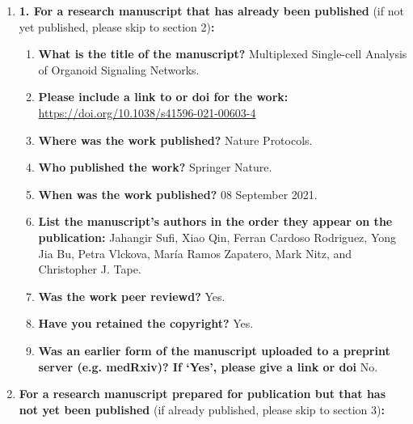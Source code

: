     \begin{enumerate}\itemsep0em
    
        \item \textbf{1.	For a research manuscript that has already been published} (if not yet published, please skip to section 2)\textbf{:}
        \begin{enumerate}\itemsep0em
            \item \textbf{What is the title of the manuscript?}
            Multiplexed Single-cell Analysis of Organoid Signaling Networks.
            \item \textbf{Please include a link to or doi for the work:}
            \url{https://doi.org/10.1038/s41596-021-00603-4}
            \item \textbf{Where was the work published?}
            Nature Protocols.
            \item \textbf{Who published the work?}
            Springer Nature.
            \item \textbf{When was the work published?}
            08 September 2021.
            \item \textbf{List the manuscript's authors in the order they appear on the publication:}
            Jahangir Sufi, Xiao Qin, Ferran Cardoso Rodriguez, Yong Jia Bu, Petra Vlckova, María Ramos Zapatero, Mark Nitz, and Christopher J. Tape.   
            \item \textbf{Was the work peer reviewd?}
            Yes.
            \item \textbf{Have you retained the copyright?}
            Yes.
            \item \textbf{Was an earlier form of the manuscript uploaded to a preprint server (e.g. medRxiv)? If ‘Yes’, please give a link or doi} 
            No.
        \end{enumerate}
        \item \textbf{For a research manuscript prepared for publication but that has not yet been published} (if already published, please skip to section 3)\textbf{:}

\end{enumerate}
